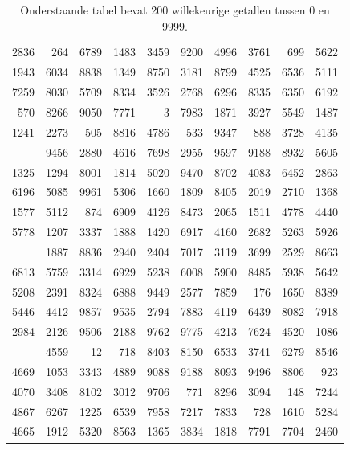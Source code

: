 \documentclass[
]{book}
\begin{document}
\begin{table}

\caption{\label{tab:A1}Onderstaande tabel bevat 200 willekeurige getallen tussen 0 en 9999.}
\centering
\begin{tabular}[t]{rrrrrrrrrr}
\toprule
 &  &  &  &  &  &  &  &  & \\
\midrule
2836 & 264 & 6789 & 1483 & 3459 & 9200 & 4996 & 3761 & 699 & 5622\\
1943 & 6034 & 8838 & 1349 & 8750 & 3181 & 8799 & 4525 & 6536 & 5111\\
7259 & 8030 & 5709 & 8334 & 3526 & 2768 & 6296 & 8335 & 6350 & 6192\\
570 & 8266 & 9050 & 7771 & 3 & 7983 & 1871 & 3927 & 5549 & 1487\\
1241 & 2273 & 505 & 8816 & 4786 & 533 & 9347 & 888 & 3728 & 4135\\
\addlinespace
6688 & 9456 & 2880 & 4616 & 7698 & 2955 & 9597 & 9188 & 8932 & 5605\\
1325 & 1294 & 8001 & 1814 & 5020 & 9470 & 8702 & 4083 & 6452 & 2863\\
6196 & 5085 & 9961 & 5306 & 1660 & 1809 & 8405 & 2019 & 2710 & 1368\\
1577 & 5112 & 874 & 6909 & 4126 & 8473 & 2065 & 1511 & 4778 & 4440\\
5778 & 1207 & 3337 & 1888 & 1420 & 6917 & 4160 & 2682 & 5263 & 5926\\
\addlinespace
6635 & 1887 & 8836 & 2940 & 2404 & 7017 & 3119 & 3699 & 2529 & 8663\\
6813 & 5759 & 3314 & 6929 & 5238 & 6008 & 5900 & 8485 & 5938 & 5642\\
5208 & 2391 & 8324 & 6888 & 9449 & 2577 & 7859 & 176 & 1650 & 8389\\
5446 & 4412 & 9857 & 9535 & 2794 & 7883 & 4119 & 6439 & 8082 & 7918\\
2984 & 2126 & 9506 & 2188 & 9762 & 9775 & 4213 & 7624 & 4520 & 1086\\
\addlinespace
371 & 4559 & 12 & 718 & 8403 & 8150 & 6533 & 3741 & 6279 & 8546\\
4669 & 1053 & 3343 & 4889 & 9088 & 9188 & 8093 & 9496 & 8806 & 923\\
4070 & 3408 & 8102 & 3012 & 9706 & 771 & 8296 & 3094 & 148 & 7244\\
4867 & 6267 & 1225 & 6539 & 7958 & 7217 & 7833 & 728 & 1610 & 5284\\
4665 & 1912 & 5320 & 8563 & 1365 & 3834 & 1818 & 7791 & 7704 & 2460\\
\bottomrule
\end{tabular}
\end{table}
\end{document}

